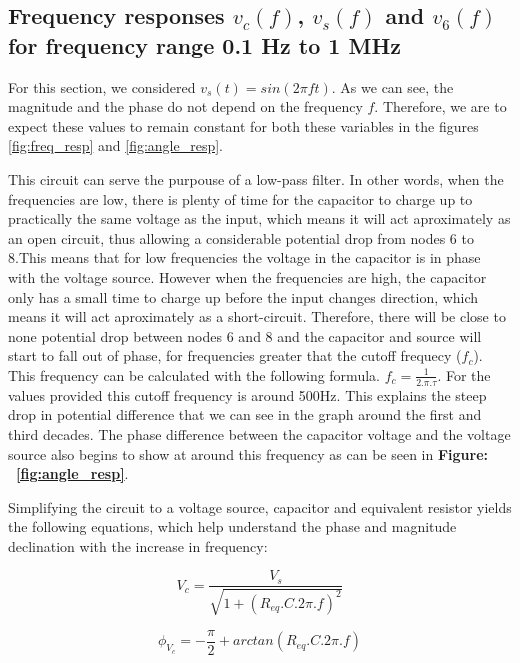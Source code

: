 \subsection{Frequency responses $v_c(f)$, $v_s(f)$ and $v_6(f)$ for frequency range 0.1 Hz to 1 MHz}
\label{ref}
For this section, we considered $v_s( t)  = sin( 2 \pi f t )$. As we can see, the magnitude and the phase do not depend on the frequency $f$. Therefore, we are to expect these values to remain constant for both these variables in the figures \ref{fig:freq_resp} and \ref{fig:angle_resp}.\par 
This circuit can serve the purpouse of a low-pass filter.
In other words, when the frequencies are low, there is plenty of time for the capacitor 
to charge up to practically the same voltage as the input, which means
it will act aproximately as an open circuit, thus allowing a considerable potential drop 
from nodes 6 to 8.This means that for low frequencies the voltage in the capacitor
is in phase with the voltage source. However when the frequencies are high, 
the capacitor only has a small time to charge up before the input changes direction, which 
means it will act aproximately as a short-circuit. Therefore, there will be close to none 
potential drop between nodes 6 and 8 and the capacitor and source will start to fall 
out of phase, for frequencies greater that the cutoff frequecy ($f_c$). 
This frequency can be calculated with the following formula. $f_c = \frac{1}{2.\pi.\tau}$.  
For the values provided this cutoff frequency is around 500Hz. This explains the steep drop 
in potential difference that we can see in the graph around the first and third decades.
The phase difference between the capacitor voltage and the voltage source also begins to 
show at around this frequency as can be seen in \textbf{Figure: ~\ref{fig:angle_resp}}.\par
Simplifying the circuit to a voltage source, capacitor and equivalent resistor yields the following equations, which help understand the phase and magnitude declination with the increase in frequency: 

\begin{equation}
  V_c = \frac{V_s}{\sqrt{1 + (R_{eq}.C.2\pi.f)^2}}
  \label{eq:freqresp1}
\end{equation}

\begin{equation}
  \phi_{V_c} = -\frac{\pi}{2} + arctan(R_{eq}.C.2\pi.f)
  \label{eq:freqresp2}
\end{equation}

